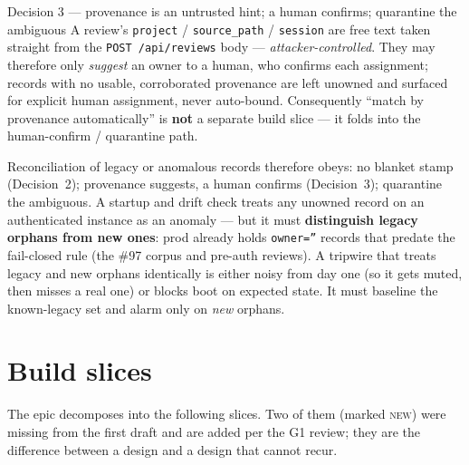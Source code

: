 \documentclass[11pt]{article}
\begin{document}
\begin{decision}{Decision 3 --- provenance is an untrusted hint; a human confirms; quarantine the ambiguous}
A review's \texttt{project} / \texttt{source\_path} / \texttt{session} are free text taken
straight from the \texttt{POST /api/reviews} body --- \emph{attacker-controlled}. They may
therefore only \emph{suggest} an owner to a human, who confirms each assignment; records with no
usable, corroborated provenance are left unowned and surfaced for explicit human assignment,
never auto-bound. Consequently ``match by provenance automatically'' is \textbf{not} a separate
build slice --- it folds into the human-confirm / quarantine path.
\end{decision}

Reconciliation of legacy or anomalous records therefore obeys: no blanket stamp (Decision~2);
provenance suggests, a human confirms (Decision~3); quarantine the ambiguous. A startup and drift
check treats any unowned record on an authenticated instance as an anomaly --- but it must
\textbf{distinguish legacy orphans from new ones}: prod already holds \texttt{owner=''} records
that predate the fail-closed rule (the \#97 corpus and pre-auth reviews). A tripwire that treats
legacy and new orphans identically is either noisy from day one (so it gets muted, then misses a
real one) or blocks boot on expected state. It must baseline the known-legacy set and alarm only
on \emph{new} orphans.

\section{Build slices}
\label{sec:slices}

The epic decomposes into the following slices. Two of them (marked \textsc{new}) were missing
from the first draft and are added per the G1 review; they are the difference between a design
and a design that cannot recur.
\end{document}
